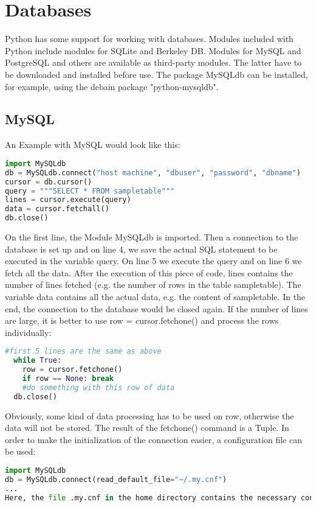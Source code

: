 \section{Databases}
Python has some support for working with databases. Modules included with Python
include modules for SQLite and Berkeley DB. Modules for MySQL and PostgreSQL and
others are available as third-party modules. The latter have to be downloaded
and installed before use. The package MySQLdb can be installed, for example,
using the debain package "python-mysqldb".

\subsection{MySQL}
An Example with MySQL would look like this:
\lstset{basicstyle=\scriptsize, numbers=left, captionpos=b, tabsize=4}
\begin{lstlisting}[caption=MySQL example,language={Python},
xleftmargin=15pt, label=lst:mysqlexample]
import MySQLdb
db = MySQLdb.connect("host machine", "dbuser", "password", "dbname")
cursor = db.cursor()
query = """SELECT * FROM sampletable"""
lines = cursor.execute(query)
data = cursor.fetchall()
db.close()
\end{lstlisting}

On the first line, the Module MySQLdb is imported. Then a connection to the
database is set up and on line 4, we save the actual SQL statement to be
executed in the variable query. On line 5 we execute the query and on line 6 we
fetch all the data. After the execution of this piece of code, lines contains
the number of lines fetched (e.g. the number of rows in the table sampletable).
The variable data contains all the actual data, e.g. the content of sampletable.
In the end, the connection to the database would be closed again. If the number
of lines are large, it is better to use row = cursor.fetchone() and process the
rows individually:
\lstset{basicstyle=\scriptsize, numbers=left, captionpos=b, tabsize=4}
\begin{lstlisting}[caption=retrive row,language={Python},
xleftmargin=15pt, label=lst:retriverow]
  #first 5 lines are the same as above
  while True:
    row = cursor.fetchone()
    if row == None: break
    #do something with this row of data
  db.close()
\end{lstlisting}

Obviously, some kind of data processing has to be used on row, otherwise the
data will not be stored. The result of the fetchone() command is a Tuple.  In
order to make the initialization of the connection easier, a configuration file
can be used:
\lstset{basicstyle=\scriptsize, numbers=left, captionpos=b, tabsize=4}
\begin{lstlisting}[caption=Connection file,language={Python},
xleftmargin=15pt, label=lst:connectionfile]
import MySQLdb
db = MySQLdb.connect(read_default_file="~/.my.cnf")
...
Here, the file .my.cnf in the home directory contains the necessary configuration information for MySQL.
\end{lstlisting}

